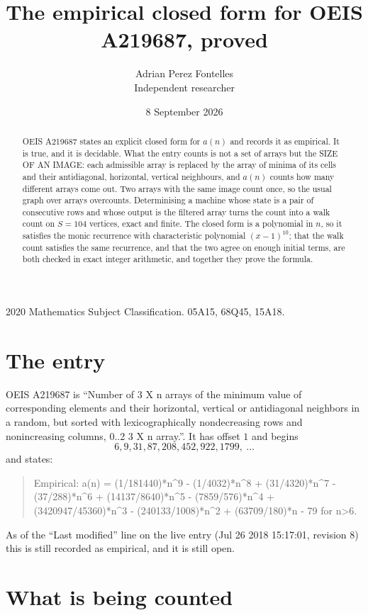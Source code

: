 \documentclass[11pt,a4paper]{article}
\title{The empirical closed form for OEIS A219687, proved}
\author{Adrian Perez Fontelles\\ \small Independent researcher}
\date{8 September 2026}
\theoremstyle{plain}
\theoremstyle{definition}
\begin{document}
\maketitle

\begin{abstract}
OEIS A219687 states an explicit closed form for $a(n)$ and records it as empirical. It is true, and
it is decidable. What the entry counts is not a set of arrays but the SIZE OF AN IMAGE: each
admissible array is replaced by the array of minima of its cells and their antidiagonal, horizontal, vertical neighbours,
and $a(n)$ counts how many different arrays come out. Two arrays with the same image count
once, so the usual graph over arrays overcounts. Determinising a machine whose state is a pair
of consecutive rows and whose output is the filtered array turns the count into a walk count on
$S=104$ vertices, exact and finite. The closed form is a polynomial in $n$, so it satisfies the
monic recurrence with characteristic polynomial $(x-1)^{10}$; that the walk count
satisfies the same recurrence, and that the two agree on enough initial terms, are both checked
in exact integer arithmetic, and together they prove the formula.
\end{abstract}

\noindent\small 2020 Mathematics Subject Classification. 05A15, 68Q45, 15A18.\normalsize

\section{The entry}

OEIS A219687 is ``Number of 3 X n arrays of the minimum value of corresponding elements and their horizontal, vertical or antidiagonal neighbors in a random, but sorted with lexicographically nondecreasing rows and nonincreasing columns, 0..2 3 X n array.''. It has offset $1$ and begins
\[
6, 9, 31, 87, 208, 452, 922, 1799,\ \dots
\]
and states:
\begin{quote}
Empirical: a(n) = (1/181440)*n\^{}9 - (1/4032)*n\^{}8 + (31/4320)*n\^{}7 - (37/288)*n\^{}6 + (14137/8640)*n\^{}5 - (7859/576)*n\^{}4 + (3420947/45360)*n\^{}3 - (240133/1008)*n\^{}2 + (63709/180)*n - 79 for n>6.
\end{quote}
As of the ``Last modified'' line on the live entry (Jul 26 2018 15:17:01, revision 8)
this is still recorded as empirical, and it is still open.

\section{What is being counted}
\end{document}
